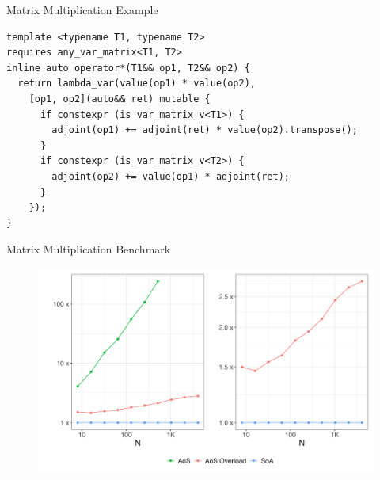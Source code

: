 \documentclass[dvipsnames]{beamer}
\newenvironment{CacheLine}[1][]{
  \begin{tikzpicture}[x=1.2cm,y=0.8cm,font=\footnotesize,>=Stealth,#1]
    \def\CacheH{1.0}   %
    \def\CacheBelow{1.0} %

}{
    \foreach \i in {1,...,7} { \draw[black!40] (\i,0) -- (\i,\CacheH); }
    \draw[line width=0.6pt, rounded corners=2pt] (0,0) rectangle (8,\CacheH);
    \foreach \i in {0,...,7} {
      \node[below=3pt, text=black!75] at (\i+0.5,0) {8B \i};
    }
  \end{tikzpicture}
}
\newcommand{\CacheColor}[2]{%
  \fill[#2, fill opacity=0.35, draw=none] (#1,0) rectangle ++(1,\CacheH);%
}
\newcommand{\CacheMarkAbove}[3][green!60!black]{%
  \draw[-{Stealth[length=3mm]}, very thick, draw=#1] (#2,\CacheH+0.36) -- (#2,\CacheH+0.04);
  \node[above, text=#1] at (#2,\CacheH+0.36) {#3};
}
\newcommand{\CacheMarkBelow}[3][green!60!black]{%
  \draw[-{Stealth[length=3mm]}, very thick, draw=#1] (#2,-\CacheBelow+0.28) -- (#2,0.02);
  \node[below, anchor=west, text=#1] at (#2,-\CacheBelow-0.2) {#3};
}
\newcommand{\CacheSetBelow}[1]{\def\CacheBelow{#1}}
\begin{document}

\begin{frame}[fragile]{Matrix Multiplication Example}
\begin{verbatim}
template <typename T1, typename T2>
requires any_var_matrix<T1, T2>
inline auto operator*(T1&& op1, T2&& op2) {
  return lambda_var(value(op1) * value(op2),
    [op1, op2](auto&& ret) mutable {
      if constexpr (is_var_matrix_v<T1>) {
        adjoint(op1) += adjoint(ret) * value(op2).transpose();
      }
      if constexpr (is_var_matrix_v<T2>) {
        adjoint(op2) += value(op1) * adjoint(ret);
      }
    });
}
\end{verbatim}
\end{frame}



\begin{frame}{Matrix Multiplication Benchmark}
\begin{figure}
\centerline{\includegraphics[scale=.5]{img/matmul_bench.png}}
\label{fig-matmul}
\end{figure}
\end{frame}
\end{document}
